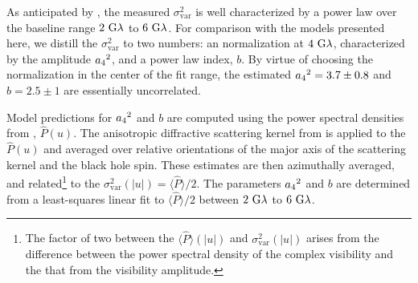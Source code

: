 
As anticipated by \citet{Georgiev_2022}, the measured $\sigma_\text{var}^2$ is well characterized by a power law over the baseline range $2~{\rm G}\lambda$ to $6~{\rm G}\lambda$.  For comparison with the models presented here, we distill the $\sigma_{\text{var}}^2$ to two numbers: an normalization at $4~{\rm G}\lambda$, characterized by the amplitude ${a_4}^2$, and a power law index, $b$.  By virtue of choosing the normalization in the center of the fit range, the estimated ${a_4}^2=3.7\pm0.8$ and $b=2.5\pm1$ are essentially uncorrelated.

Model predictions for ${a_4}^2$ and $b$ are computed using the power spectral densities from \citet{Georgiev_2022}, $\hat{P}(u)$. The anisotropic diffractive scattering kernel from \citet{Johnson_2018} is applied to the $\hat{P}(u)$ and averaged over relative orientations of the major axis of the scattering kernel and the black hole spin.  These estimates are then azimuthally averaged, and related\footnote{The factor of two between the $\langle\hat{P}\rangle(|u|)$ and $\sigma_\text{var}^2(|u|)$ arises from the difference between the power spectral density of the complex visibility and the that from the visibility amplitude.} to the $\sigma_\text{var}^2(|u|)=\langle \hat{P}\rangle/2$.  The parameters ${a_4}^2$ and $b$ are determined from a least-squares linear fit to $\langle \hat{P}\rangle/2$ between $2~{\rm G}\lambda$ to $6~{\rm G}\lambda$.







